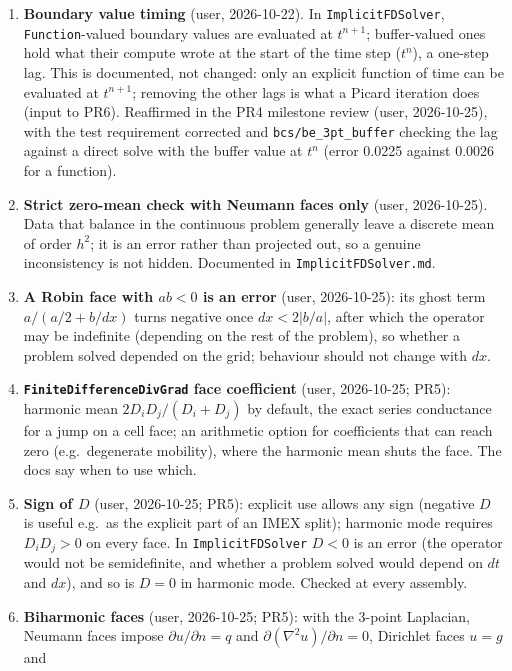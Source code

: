 \documentclass[11pt]{article}
\begin{document}
\begin{enumerate}[leftmargin=*]
iterations with boundary faces 7, 6, 6 at $n = 64, 128, 256$
($l_{tol}=10^{-10}$, CPU) against 9, 9, 9 periodic.
\item \textbf{Boundary value timing} (user, 2026-10-22). In
\texttt{ImplicitFDSolver}, \texttt{Function}-valued boundary values are
evaluated at $t^{n+1}$; buffer-valued ones hold what their compute wrote at
the start of the time step ($t^n$), a one-step lag. This is documented, not
changed: only an explicit function of time can be evaluated at $t^{n+1}$;
removing the other lags is what a Picard iteration does (input to PR6).
Reaffirmed in the PR4 milestone review (user, 2026-10-25), with the test
requirement corrected and \texttt{bcs/be\_3pt\_buffer} checking the lag
against a direct solve with the buffer value at $t^n$ (error 0.0225 against
0.0026 for a function).
\item \textbf{Strict zero-mean check with Neumann faces only} (user,
2026-10-25). Data that balance in the continuous problem generally leave a
discrete mean of order $h^2$; it is an error rather than projected out, so a
genuine inconsistency is not hidden. Documented in \texttt{ImplicitFDSolver.md}.
\item \textbf{A Robin face with $ab < 0$ is an error} (user, 2026-10-25): its
ghost term $a/(a/2 + b/dx)$ turns negative once $dx < 2|b/a|$, after which the
operator may be indefinite (depending on the rest of the problem), so whether a
problem solved depended on the grid; behaviour should not change with $dx$.
\item \textbf{\texttt{FiniteDifferenceDivGrad} face coefficient} (user,
2026-10-25; PR5): harmonic mean $2D_iD_j/(D_i+D_j)$ by default, the exact
series conductance for a jump on a cell face; an arithmetic option for
coefficients that can reach zero (e.g.\ degenerate mobility), where the
harmonic mean shuts the face. The docs say when to use which.
\item \textbf{Sign of $D$} (user, 2026-10-25; PR5): explicit use allows any
sign (negative $D$ is useful e.g.\ as the explicit part of an IMEX split);
harmonic mode requires $D_iD_j > 0$ on every face. In \texttt{ImplicitFDSolver}
$D < 0$ is an error (the operator would not be semidefinite, and whether a
problem solved would depend on $dt$ and $dx$), and so is $D = 0$ in harmonic
mode. Checked at every assembly.
\item \textbf{Biharmonic faces} (user, 2026-10-25; PR5): with the 3-point
Laplacian, Neumann faces impose $\partial u/\partial n = q$ and
$\partial(\nabla^2 u)/\partial n = 0$, Dirichlet faces $u = g$ and

\end{enumerate}
\end{document}
